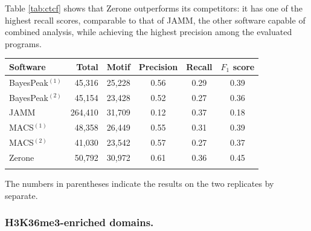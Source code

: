 \documentclass{bioinfo}
\begin{document}
Table \ref{tab:ctcf} shows that Zerone outperforms its competitors: it has one
of the highest recall scores, comparable to that of JAMM, the other software
capable of combined analysis, while achieving the highest precision among the
evaluated programs.

\begin{table}[!t]
{\begin{tabular}{lrrccc}
        \toprule
        \textbf{Software}  & \textbf{Total}  & \textbf{Motif} &
        \textbf{Precision} & \textbf{Recall} & \textbf{$F_{1}$ score} \\
        \midrule
        BayesPeak$^{(1)}$ &  45,316 & 25,228 & 0.56 & 0.29 & 0.39 \\
        BayesPeak$^{(2)}$ &  45,154 & 23,428 & 0.52 & 0.27 & 0.36 \\
        JAMM              & 264,410 & 31,709 & 0.12 & 0.37 & 0.18 \\
        MACS$^{(1)}$      &  48,358 & 26,449 & 0.55 & 0.31 & 0.39 \\
        MACS$^{(2)}$      &  41,030 & 23,542 & 0.57 & 0.27 & 0.37 \\
        Zerone            &  50,792 & 30,972 & 0.61 & 0.36 & 0.45 \\
        \botrule
\end{tabular}}{
The numbers in parentheses indicate the results on the two replicates
by separate.}
\end{table}

\subsubsection{H3K36me3-enriched domains.}
\end{document}
